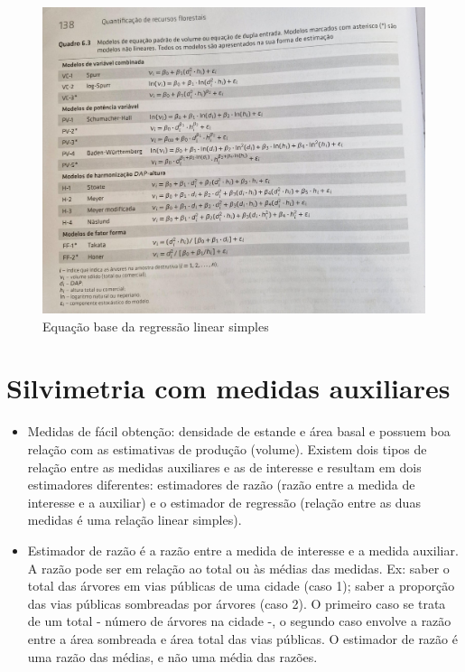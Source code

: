 \documentclass[
]{article}
\begin{document}
\begin{figure}

{\centering \includegraphics[width=0.8\linewidth]{IMAGES/dupla-entrada-volume} 

}

\caption{Equação base da regressão linear simples}\label{fig:unnamed-chunk-24}
\end{figure}

\newpage

\section{Silvimetria com medidas
auxiliares}\label{silvimetria-com-medidas-auxiliares}

\begin{itemize}
\item
  Medidas de fácil obtenção: densidade de estande e área basal e possuem
  boa relação com as estimativas de produção (volume). Existem dois
  tipos de relação entre as medidas auxiliares e as de interesse e
  resultam em dois estimadores diferentes: estimadores de razão (razão
  entre a medida de interesse e a auxiliar) e o estimador de regressão
  (relação entre as duas medidas é uma relação linear simples).
\item
  Estimador de razão é a razão entre a medida de interesse e a medida
  auxiliar. A razão pode ser em relação ao total ou às médias das
  medidas. Ex: saber o total das árvores em vias públicas de uma cidade
  (caso 1); saber a proporção das vias públicas sombreadas por árvores
  (caso 2). O primeiro caso se trata de um total - número de árvores na
  cidade -, o segundo caso envolve a razão entre a área sombreada e área
  total das vias públicas. O estimador de razão é uma razão das médias,
  e não uma média das razões.
\end{itemize}
\end{document}
